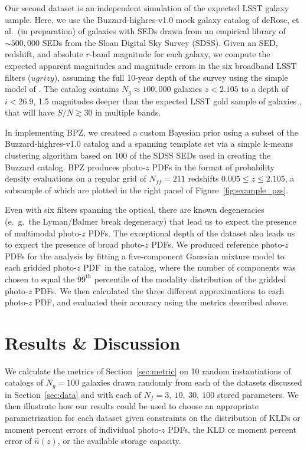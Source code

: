 \documentclass[\docopts]{\docclass}
\newcommand{\pz}{photo-$z$ PDF}
\begin{document}
Our second dataset is an independent simulation of the expected LSST galaxy 
sample.
Here, we use the Buzzard-highres-v1.0 mock galaxy catalog of deRose, et al.\ 
(in preparation) of galaxies with SEDs drawn from an empirical library of 
$\sim500,000$ SEDs from the Sloan Digital Sky Survey (SDSS).
Given an SED, redshift, and absolute $r$-band magnitude for each galaxy, we 
compute the expected apparent magnitudes and magnitude errors in the six 
broadband LSST filters ($ugrizy$), assuming the full 10-year depth of the 
survey using the simple model of \citet{ivezic_lsst:_2008}.
The catalog contains $N_{g}\approx100,000$ galaxies $z<2.105$ to a depth of 
$i<26.9$, 1.5 magnitudes deeper than the expected LSST gold sample of galaxies 
\citep{lsst_science_collaboration_lsst_2009}, that will have $S/N\gtrsim30$ in 
multiple bands.

In implementing BPZ, we createed a custom Bayesian prior using a subset of the 
Buzzard-highres-v1.0 catalog and a spanning template set via a simple k-means 
clustering algorithm based on $100$ of the SDSS SEDs used in creating the 
Buzzard catalog.
BPZ produces \pz s in the format of probability density evaluations on a 
regular grid of $N_{ff}=211$ redshifts $0.005\leq z\leq2.105$, a subsample of 
which are plotted in the right panel of Figure~\ref{fig:example_pzs}.

Even with six filters spanning the optical, there are known degeneracies 
(e.~g.~the Lyman/Balmer break degeneracy) that lead us to expect the presence 
of multimodal \pz s.
The exceptional depth of the dataset also leads us to expect the presence of 
broad \pz s.
We produced reference \pz s for the analysis by fitting a five-component 
Gaussian mixture model to each gridded \pz\ in the catalog, where the number of 
components was chosen to equal the $99^{\mathrm{th}}$ percentile of the 
modality distribution of the gridded \pz s.
We then calculated the three different approximations to each \pz, and 
evaluated their accuracy using the metrics described above.


\section{Results \& Discussion}
\label{sec:results}

We calculate the metrics of Section~\ref{sec:metric} on 10 random 
instantiations of catalogs of $N_{g}=100$ galaxies drawn randomly from each of 
the datasets discussed in Section~\ref{sec:data} and with each of $N_{f}=3,\ 
10,\ 30,\ 100$ stored parameters.
We then illustrate how our results could be used to choose an appropriate 
parametrization for each dataset given constraints on the distribution of KLDs 
or moment percent errors of individual \pz s, the KLD or moment percent error 
of $\hat{n}(z)$, or the available storage capacity.
\end{document}
